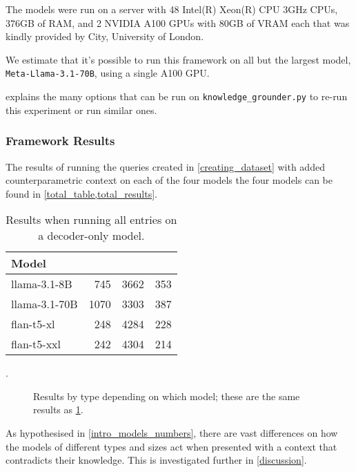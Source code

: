 The models were run on a server with 48 Intel(R) Xeon(R) CPU 3GHz CPUs, 376GB of RAM, and 2 NVIDIA A100 GPUs with 80GB of VRAM each that was kindly provided by City, University of London.

We estimate that it's possible to run this framework on all but the largest model, \texttt{Meta-Llama-3.1-70B}, using a single A100 GPU.

 explains the many options that can be run on \texttt{knowledge\_grounder.py} to re-run this experiment or run similar ones.

\subsubsection{Framework Results}
\label{framework_results}

The results of running the queries created in \cref{creating_dataset} with added counterparametric context on each of the four models the four models can be found in \cref{total_table,total_results}.

\begin{table}[htbp]
	\centering
	\footnotesize
	\begin{tabular}{l r r r}
		\toprule
			\bfseries Model & \Parametric{} & \Contextual{} & \Other{} \\
		\midrule
			\ttfamily llama-3.1-8B & 745 & 3662 & 353 \\
			\ttfamily llama-3.1-70B & 1070 & 3303 & 387 \\
		\midrule
			\ttfamily flan-t5-xl  & 248 & 4284 & 228 \\
			\ttfamily flan-t5-xxl & 242 & 4304 & 214 \\
		\bottomrule
	\end{tabular}
	\caption{Results when running all entries on a decoder-only model.}
	\label{total_table}.
\end{table}

\begin{figure}[H]
	\centering
	\caption{Results by type depending on which model; these are the same results as \cref{total_table}.}
	\label{total_results}
\end{figure}

As hypothesised in \cref{intro_models_numbers}, there are vast differences on how the models of different types and sizes act when presented with a context that contradicts their knowledge.
This is investigated further in \cref{discussion}.

